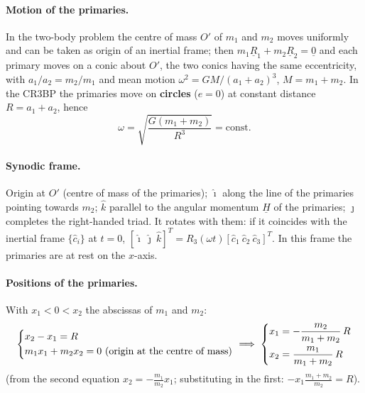 \answer
\paragraph{Motion of the primaries.} In the two-body problem the centre of mass $O'$ of $m_1$ and $m_2$ moves uniformly and can be
taken as origin of an inertial frame; then $m_1\underline R_1+m_2\underline R_2=\underline 0$ and each primary moves on a conic about
$O'$, the two conics having the same eccentricity, with $a_1/a_2=m_2/m_1$ and mean motion $\omega^2=G M/(a_1+a_2)^3$,
$M=m_1+m_2$. In the CR3BP the primaries move on \textbf{circles} ($e=0$) at constant distance $R=a_1+a_2$, hence
\begin{equation}
\omega=\sqrt{\frac{G(m_1+m_2)}{R^{3}}}=\text{const}.
\end{equation}

\paragraph{Synodic frame.} Origin at $O'$ (centre of mass of the primaries); $\hat\imath$ along the line of the primaries pointing towards
$m_2$; $\hat k$ parallel to the angular momentum $\underline H$ of the primaries; $\hat\jmath$ completes the right-handed triad. It
rotates with them: if it coincides with the inertial frame $\{\hat c_i\}$ at $t=0$, $[\hat\imath\ \hat\jmath\ \hat k]^T=R_3(\omega t)[\hat c_1\ \hat c_2\ \hat c_3]^T$.
In this frame the primaries are at rest on the $x$-axis.

\paragraph{Positions of the primaries.} With $x_1<0<x_2$ the abscissas of $m_1$ and $m_2$:
\begin{equation}
\sys{&x_2-x_1=R\\ &m_1x_1+m_2x_2=0\ \text{(origin at the centre of mass)}}
\;\Longrightarrow\;
\sys{&x_1=-\frac{m_2}{m_1+m_2}\,R\\ &x_2=\frac{m_1}{m_1+m_2}\,R}
\end{equation}
(from the second equation $x_2=-\frac{m_1}{m_2}x_1$; substituting in the first: $-x_1\frac{m_1+m_2}{m_2}=R$).

